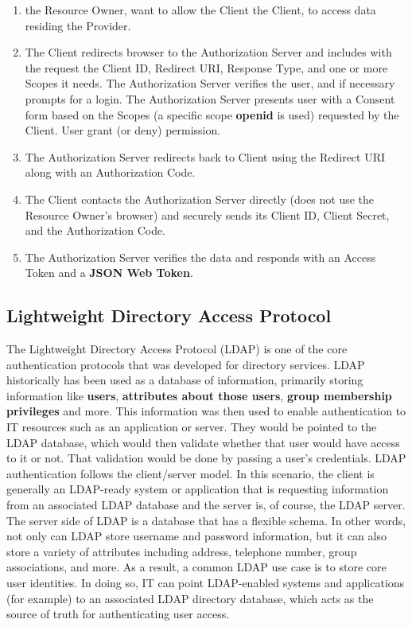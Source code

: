 \begin{enumerate}
	\item the Resource Owner, want to allow the Client the Client, to access data residing the Provider.
	
	\item The Client redirects browser to the Authorization Server and includes with the request the Client ID, Redirect URI, Response Type, and one or more Scopes it needs. The Authorization Server verifies the user, and if necessary prompts for a login. The Authorization Server presents user with a Consent form based on the Scopes (a specific scope \textbf{openid} is used) requested by the Client. User grant (or deny) permission.
	
	\item The Authorization Server redirects back to Client using the Redirect URI along with an Authorization Code.
	
	\item The Client contacts the Authorization Server directly (does not use the Resource Owner’s browser) and securely sends its Client ID, Client Secret, and the Authorization Code.
	
	\item The Authorization Server verifies the data and responds with an Access Token and a \textbf{JSON Web Token}.
\end{enumerate}


\subsection{Lightweight Directory Access Protocol}

The Lightweight Directory Access Protocol (LDAP) is one of the core authentication protocols that was developed for directory services. LDAP historically has been used as a database of information, primarily storing information like \textbf{users}, \textbf{attributes about those users}, \textbf{group membership privileges} and more. This information was then used to enable authentication to IT resources such as an application or server. They would be pointed to the LDAP database, which would then validate whether that user would have access to it or not. That validation would be done by passing a user’s credentials. LDAP authentication follows the client/server model. In this scenario, the client is generally an LDAP-ready system or application that is requesting information from an associated LDAP database and the server is, of course, the LDAP server. The server side of LDAP is a database that has a flexible schema. In other words, not only can LDAP store username and password information, but it can also store a variety of attributes including address, telephone number, group associations, and more. As a result, a common LDAP use case is to store core user identities. In doing so, IT can point LDAP-enabled systems and applications (for example) to an associated LDAP directory database, which acts as the source of truth for authenticating user access.

